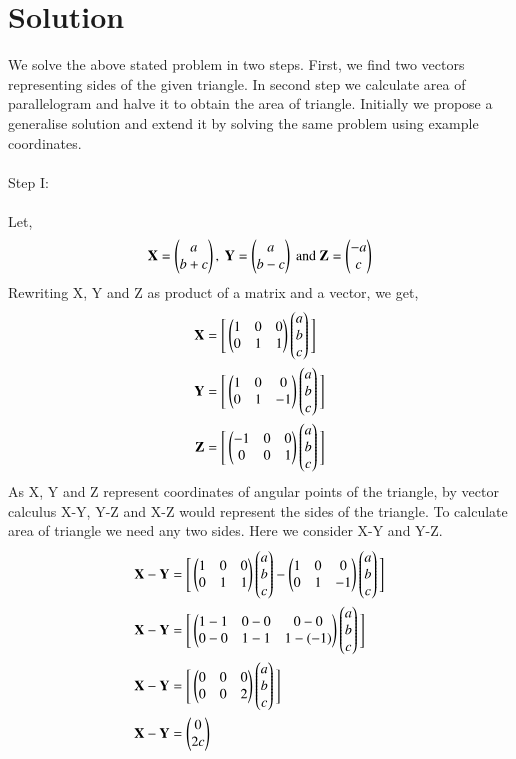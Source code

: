 \documentclass[journal,12pt]{IEEEtran}
\begin{document}
\section{Solution}
We solve the above stated problem in two steps. First, we find two vectors representing sides of the given triangle. In second step we calculate area of parallelogram and halve it to obtain the area of triangle. Initially we propose a generalise solution and extend it by solving the same problem using example coordinates.\\\\
Step I:\\\\
Let,
\begin{align}
\mathbf{X} = \begin{pmatrix}a\\b+c\end{pmatrix}, \text{ } \mathbf{Y} = \begin{pmatrix}a\\b-c\end{pmatrix} \text{ and } \mathbf{Z} = \begin{pmatrix}-a\\c\end{pmatrix}
\label{eq1}
\end{align}
Rewriting X, Y and Z as product of a matrix and a vector, we get,\\
\begin{align}
\begin{split}
\mathbf{X} & = \Bigg[\begin{pmatrix}1&0&0\\0&1&1\end{pmatrix}\begin{pmatrix}a\\b\\c\end{pmatrix}\Bigg] \\
\mathbf{Y} & = \Bigg[\begin{pmatrix}1&0&0\\0&1&-1\end{pmatrix}\begin{pmatrix}a\\b\\c\end{pmatrix}\Bigg] \\
\mathbf{Z} & = \Bigg[\begin{pmatrix}-1&0&0\\0&0&1\end{pmatrix}\begin{pmatrix}a\\b\\c\end{pmatrix}\Bigg] 
\end{split}
\label{eq2}
\end{align}
As X, Y and Z represent coordinates of angular points of the triangle, by vector calculus X-Y, Y-Z and X-Z would represent the sides of the triangle. To calculate area of triangle we need any two sides. Here we consider X-Y and Y-Z.\\
\begin{align}
\begin{split}
\mathbf{X-Y} & = \Bigg[\begin{pmatrix}1&0&0\\0&1&1\end{pmatrix}\begin{pmatrix}a\\b\\c\end{pmatrix} - \begin{pmatrix}1&0&0\\0&1&-1\end{pmatrix}\begin{pmatrix}a\\b\\c\end{pmatrix}\Bigg] \\
\mathbf{X-Y} & = \Bigg[\begin{pmatrix}1-1&0-0&0-0\\0-0&1-1&1-(-1)\end{pmatrix}\begin{pmatrix}a\\b\\c\end{pmatrix}\Bigg] \\
\mathbf{X-Y} & = \Bigg[\begin{pmatrix}0&0&0\\0&0&2\end{pmatrix}\begin{pmatrix}a\\b\\c\end{pmatrix}\Bigg] \\
\mathbf{X-Y} & = \begin{pmatrix}0\\2c\end{pmatrix}
\end{split}
\label{eq3}
\end{align}
\end{document}
